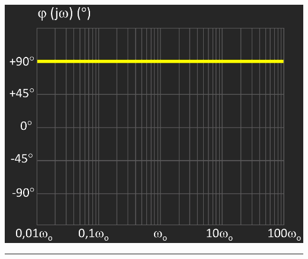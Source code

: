 \documentclass{article}
\begin{document}
\begin{minipage}{0.49\textwidth}
    \centering
    \includegraphics[width=\textwidth]{figbode222.jpg} 
\end{minipage}
\hrule
\end{document}
